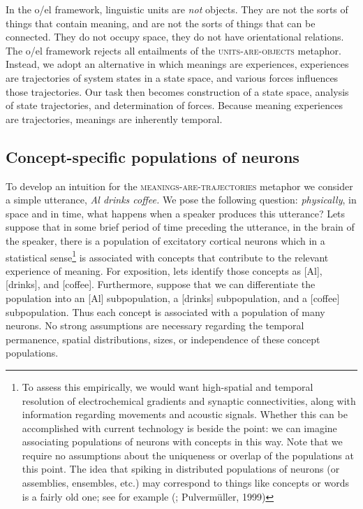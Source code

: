   In the o/el framework, linguistic units are \textit{not} objects. They are not the sorts of things that contain meaning, and are not the sorts of things that can be connected. They do not occupy space, they do not have orientational relations. The o/el framework rejects all entailments of the \textsc{units}\textsc{{}-are-}\textsc{objects} metaphor. Instead, we adopt an alternative in which meanings are experiences, experiences are trajectories of system states in a state space, and various forces influences those trajectories. Our task then becomes construction of a state space, analysis of state trajectories, and determination of forces. Because meaning experiences are trajectories, meanings are inherently temporal. 

\subsection{Concept-specific populations of neurons}

To develop an intuition for the \textsc{meanings}\textsc{{}-are-}\textsc{trajectories} metaphor we consider a simple utterance, \textit{Al drinks coffee.} We pose the following question: \textit{physically}, in space and in time, what happens when a speaker produces this utterance? Lets suppose that in some brief period of time preceding the utterance, in the brain of the speaker, there is a population of excitatory cortical neurons which in a statistical sense\footnote{To assess this empirically, we would want high-spatial and temporal resolution of electrochemical gradients and synaptic connectivities, along with information regarding movements and acoustic signals. Whether this can be accomplished with current technology is beside the point: we can imagine associating populations of neurons with concepts in this way. Note that we require no assumptions about the uniqueness or overlap of the populations at this point. The idea that spiking in distributed populations of neurons (or assemblies, ensembles, etc.) may correspond to things like concepts or words is a fairly old one; see for example (\citealt{Abeles2012,Braitenberg1978,Hebb1949}; Pulvermüller, 1999)} is associated with concepts that contribute to the relevant experience of meaning. For exposition, lets identify those concepts as [Al], [drinks], and [coffee]. Furthermore, suppose that we can differentiate the population into an [Al] subpopulation, a [drinks] subpopulation, and a [coffee] subpopulation. Thus each concept is associated with a population of many neurons. No strong assumptions are necessary regarding the temporal permanence, spatial distributions, sizes, or independence of these concept populations.

